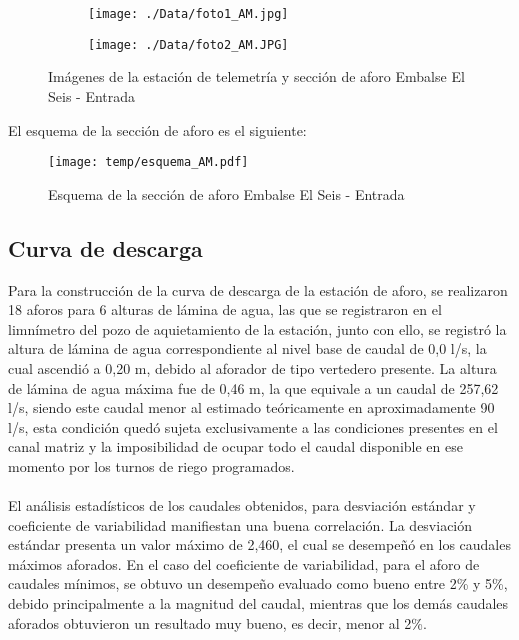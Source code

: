 \documentclass[]{article}
\begin{document}
\begin{figure}[H]
  \centering
\begin{subfigure}{.49\textwidth}
  \texttt{[image: ./Data/foto1\_AM.jpg]}
\end{subfigure}
\hfill
\begin{subfigure}{.49\textwidth}
  \texttt{[image: ./Data/foto2\_AM.JPG]}
\end{subfigure}
\caption{Imágenes de la estación de telemetría y sección de aforo Embalse El Seis - Entrada}
\label{fig:fotos_13}
\end{figure}

El esquema de la sección de aforo es el siguiente:

\begin{figure}[H]
  \centering
  \texttt{[image: temp/esquema\_AM.pdf]}
\caption{Esquema de la sección de aforo Embalse El Seis - Entrada}
\label{fig:Esquema_AM}
\end{figure}

\subsection{Curva de descarga}\label{curva-de-descarga-12}

Para la construcción de la curva de descarga de la estación de aforo, se realizaron 18 aforos para 6 alturas de lámina de agua, las que se registraron en el limnímetro del pozo de aquietamiento de la estación, junto con ello, se registró la altura de lámina de agua correspondiente al nivel base de caudal de 0,0 l/s, la cual ascendió a 0,20 m, debido al aforador de tipo vertedero presente. La altura de lámina de agua máxima fue de 0,46 m, la que equivale a un caudal de 257,62 l/s, siendo este caudal menor al estimado teóricamente en aproximadamente 90 l/s, esta condición quedó sujeta exclusivamente a las condiciones presentes en el canal matriz y la imposibilidad de ocupar todo el caudal disponible en ese momento por los turnos de riego programados.\\
\\
El análisis estadísticos de los caudales obtenidos, para desviación estándar y coeficiente de variabilidad manifiestan una buena correlación. La desviación estándar presenta un valor máximo de 2,460, el cual se desempeñó en los caudales máximos aforados. En el caso del coeficiente de variabilidad, para el aforo de caudales mínimos, se obtuvo un desempeño evaluado como bueno entre 2\% y 5\%, debido principalmente a la magnitud del caudal, mientras que los demás caudales aforados obtuvieron un resultado muy bueno, es decir, menor al 2\%.
\end{document}
